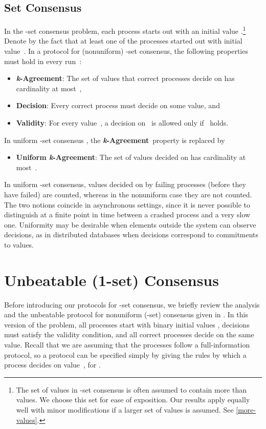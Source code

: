\documentclass[11pt]{article}
\theoremstyle{definition}
\newcommand{\defemph}[1]{\textbf{\textit{#1}}}
\newcommand{\kAgreement}{{\bf \defemph{k}-Agreement}}
\newcommand{\UnikAg}{{\bf Uniform \defemph{k}-Agreement}}
\newcommand{\Decision}{{\bf Decision}}
\newcommand{\Validity}{{\bf Validity}}
\begin{document}
\subsection{Set Consensus}

In the -set consensus problem, each process  starts out with an initial value .\footnote{The set of values in -set consensus is  often assumed to contain more than  values. We choose this set for ease of exposition. Our results apply equally well with minor modifications if a larger set of values is assumed. See \cref{more-values}.}
Denote by  the fact that at least one of the processes started out with initial value~.
In  a protocol for (nonuniform) -set consensus,
the following properties must hold in every run~:

\begin{itemize}
\item[]{\kAgreement:}
The set of values that correct processes decide on has cardinality at most~,
\item[]{\Decision:} Every correct process must decide on some value, and
\item[]{\Validity:} For every value~, a decision on~ is allowed only if~ holds.
\end{itemize}

In uniform -set consensus \cite{CBS-uni,Dutta-uni,H86,KR-uni,Raynal04-uni,WTC-uni}, the \kAgreement\ property is replaced by

\begin{itemize}
\item[]{\UnikAg:}
The set of values decided on
has cardinality at most~.
\end{itemize}

\noindent
In uniform -set consensus,
values decided on by failing processes
(before they have failed)
are counted, whereas in the nonuniform case they are not
counted.
The two notions coincide in asynchronous settings, since it is never possible to distinguish at a finite point in time between a crashed process and a very slow one.
Uniformity may be desirable
when elements outside the system can observe decisions, as in distributed databases when decisions correspond to commitments to values.

\section{Unbeatable (1-set) Consensus}
\label{sec:unB-consensus}

Before introducing our protocols for -set consensus, we briefly review the analysis and the unbeatable protocol for nonuniform (-set) consensus
 given in \cite{AYY-DISC}.
In this version of the problem, all processes start with binary initial values ,
decisions must satisfy the validity condition, and all correct processes decide on the same value. Recall that we are assuming that the processes follow a full-information protocol, so a protocol can be specified simply by giving the rules by which a process decides on value~, for .
\end{document}
